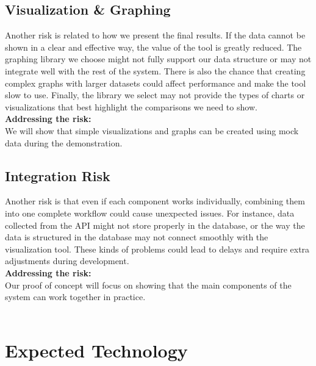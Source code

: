 \documentclass{article}
\begin{document}
\subsection*{Visualization \& Graphing}\vspace{-0.5em}
Another risk is related to how we present the final results. If the data cannot be shown in a clear and effective way, the value of the tool is greatly reduced. The graphing library we choose might not fully support our data structure or may not integrate well with the rest of the system. There is also the chance that creating complex graphs with larger datasets could affect performance and make the tool slow to use. Finally, the library we select may not provide the types of charts or visualizations that best highlight the comparisons we need to show.
\\\textbf{Addressing the risk:}\\
We will show that simple visualizations and graphs can be created using mock data during the demonstration.

\subsection*{Integration Risk}\vspace{-0.5em}
Another risk is that even if each component works individually, combining them into one complete workflow could cause unexpected issues. For instance, data collected from the API might not store properly in the database, or the way the data is structured in the database may not connect smoothly with the visualization tool. These kinds of problems could lead to delays and require extra adjustments during development.
\\\textbf{Addressing the risk:}\\
Our proof of concept will focus on showing that the main components of the system can work together in practice. \\\\

\section{Expected Technology}
\end{document}

